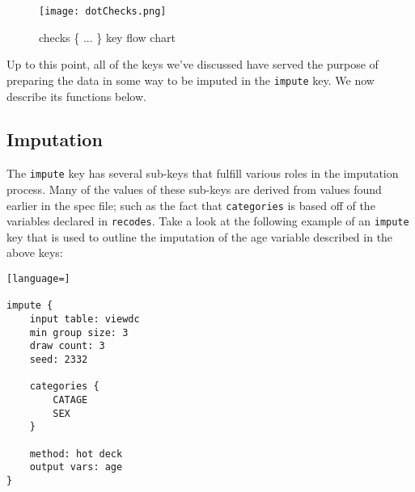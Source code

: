 \documentclass{article}
\begin{document}
\begin{figure}
\begin{center}
\texttt{[image: dotChecks.png]}
\caption{checks \{ ... \} key flow chart}\label{checkflow}
\end{center}
\end{figure}

Up to this point, all of the keys
we've discussed have served the purpose of preparing the data in some way to be imputed in the 
{\tt impute} key. We now describe its functions below.


\subsection{Imputation} \label{imputesec}
The {\tt impute} key has several sub-keys that fulfill various 
roles in the imputation process. Many of the values of these sub-keys are derived from values 
found earlier in the spec file; such as the fact that {\tt categories} is based off of 
the variables declared in {\tt recodes}. Take a look at the following example of an {\tt impute} key 
that is used to outline the imputation of the age variable described in the above keys:

\begin{lstlisting}[language=]

impute {
    input table: viewdc
    min group size: 3
    draw count: 3
    seed: 2332

    categories {
        CATAGE
        SEX
    }

    method: hot deck
    output vars: age
}


\end{lstlisting}
\end{document}
